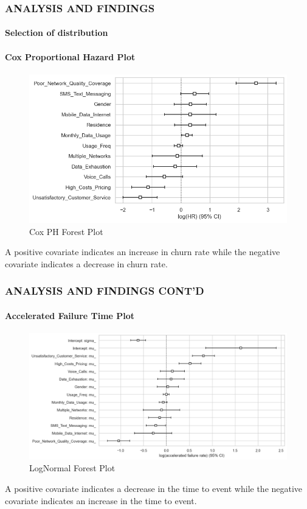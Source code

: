 \documentclass[12pt]{beamer}
\begin{document}
	
	\begin{frame}
		\frametitle{ANALYSIS AND FINDINGS}
        \framesubtitle{Selection of distribution}
      \framesubtitle{Cox Proportional Hazard Plot}  

		\begin{figure}[H]
			\centering
			\begin{minipage}{0.8\textwidth}
				\centering
				\includegraphics[width=\textwidth]{Figure 4/4.2.png}
				\caption{Cox PH Forest Plot}
				\label{Figure 3}
			\end{minipage}
		
		\end{figure}
A positive covariate indicates an increase in churn rate while the negative covariate indicates a decrease in churn rate.
 \end{frame}
 
	\begin{frame}
		\frametitle{ANALYSIS AND FINDINGS CONT'D}
      \framesubtitle{Accelerated Failure Time Plot}  

		\begin{figure}[H]
			\centering
			\begin{minipage}{0.8\textwidth}
				\centering
				\includegraphics[width=\textwidth]{Figure 4/4.4.png}
				\caption{LogNormal Forest Plot}
				\label{Figure 4}
				
			\end{minipage}
        \end{figure}
A positive covariate indicates a decrease in the time to event while the negative covariate indicates an increase in the time to event.	
 \end{frame}
  
\end{document}
